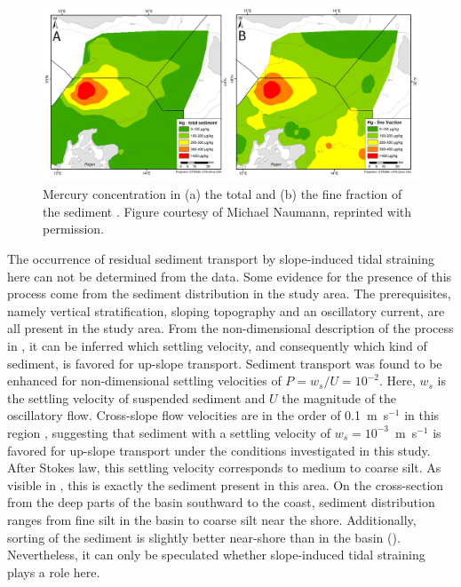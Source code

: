    \begin{figure}[ht]
\includegraphics[width=15cm]{bilder/hg.pdf}
 \caption{Mercury concentration in (a) the total and (b) the fine 
fraction of the sediment \citep[][]{mercury}. Figure courtesy of Michael 
Naumann, reprinted with permission.}
 \label{hg}
 \end{figure}
 
The occurrence of residual sediment transport by slope-induced tidal straining 
here can not be determined from the data. Some evidence for the presence of 
this process come from the sediment distribution in the study area. The 
prerequisites, namely vertical stratification, sloping 
topography and an oscillatory current, are all present in the study area. From 
the non-dimensional description of the process in \cite{schulzumlauf2016}, 
it can be inferred which settling velocity, and consequently which kind of 
sediment, is favored for up-slope transport. Sediment transport was found 
to be enhanced for non-dimensional settling velocities of $P= w_s \slash U = 
10^{-2}$. Here, $w_s$ is the settling velocity of suspended sediment and $U$ 
the magnitude of the oscillatory flow. Cross-slope flow velocities are in the 
order of 0.1~m~s$^{-1}$ in this region \citep[][data from this 
study]{lass1993}, suggesting that sediment with a settling velocity of 
$w_s=10^{-3}$~m~s$^{-1}$ is favored for up-slope transport under the conditions 
investigated in this study. After Stokes law, this settling velocity 
corresponds to medium to coarse silt. As visible in , this is 
exactly the sediment present in this area. On the cross-section from the deep 
parts of the basin southward to the coast, sediment distribution ranges from 
fine silt in the basin to coarse silt near the shore. Additionally, sorting of 
the sediment is slightly better near-shore than in the basin 
(). Nevertheless, it can only be speculated whether 
slope-induced tidal straining plays a role here.


